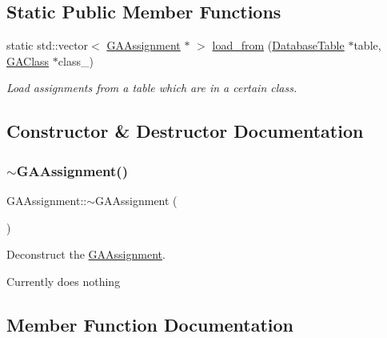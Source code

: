 \subsection*{Static Public Member Functions}
\begin{DoxyCompactItemize}
\item 
static std\+::vector$<$ \hyperlink{class_g_a_assignment}{G\+A\+Assignment} $\ast$ $>$ \hyperlink{class_g_a_assignment_a167d821c1311025490e4bbbbac6d8ad4}{load\+\_\+from} (\hyperlink{class_database_table}{Database\+Table} $\ast$table, \hyperlink{class_g_a_class}{G\+A\+Class} $\ast$class\+\_\+)
\begin{DoxyCompactList}\small\item\em Load assignments from a table which are in a certain class. \end{DoxyCompactList}\end{DoxyCompactItemize}


\subsection{Constructor \& Destructor Documentation}
\mbox{\label{class_g_a_assignment_a09ccbb9ff47203cf98fce42fe934e4d2}} 
\subsubsection{\texorpdfstring{$\sim$\+G\+A\+Assignment()}{~GAAssignment()}}
{\footnotesize\ttfamily G\+A\+Assignment\+::$\sim$\+G\+A\+Assignment (\begin{DoxyParamCaption}{ }\end{DoxyParamCaption})\hspace{0.3cm}{\ttfamily [virtual]}}



Deconstruct the \hyperlink{class_g_a_assignment}{G\+A\+Assignment}. 

Currently does nothing 

\subsection{Member Function Documentation}
\mbox{\label{class_g_a_assignment_ae16983396d1f57845b70f607ec44dc41}} 
